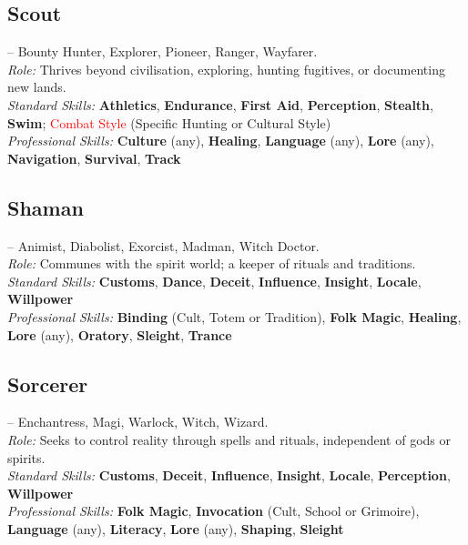 \documentclass[10pt]{article}
\newcommand{\skill}[1]{\textbf{#1}}
\begin{document}
\vspace{0.2cm}
\subsection*{Scout}
\label{career:scout}
 -- Bounty Hunter, Explorer, Pioneer, Ranger, Wayfarer.\\
\textit{Role:} Thrives beyond civilisation, exploring, hunting fugitives, or documenting new lands.\\
\textit{Standard Skills:} \skill{Athletics}, \skill{Endurance}, \skill{First Aid}, \skill{Perception}, \skill{Stealth}, \skill{Swim}; \textcolor{red}{Combat Style} (Specific Hunting or Cultural Style)\\
\textit{Professional Skills:} \skill{Culture} (any), \skill{Healing}, \skill{Language} (any), \skill{Lore} (any), \skill{Navigation}, \skill{Survival}, \skill{Track}

\vspace{0.2cm}
\subsection*{Shaman}
\label{career:shaman}
 -- Animist, Diabolist, Exorcist, Madman, Witch Doctor.\\
\textit{Role:} Communes with the spirit world; a keeper of rituals and traditions.\\
\textit{Standard Skills:} \skill{Customs}, \skill{Dance}, \skill{Deceit}, \skill{Influence}, \skill{Insight}, \skill{Locale}, \skill{Willpower}\\
\textit{Professional Skills:} \skill{Binding} (Cult, Totem or Tradition), \skill{Folk Magic}, \skill{Healing}, \skill{Lore} (any), \skill{Oratory}, \skill{Sleight}, \skill{Trance}

\vspace{0.2cm}
\subsection*{Sorcerer}
\label{career:sorcerer}
 -- Enchantress, Magi, Warlock, Witch, Wizard.\\
\textit{Role:} Seeks to control reality through spells and rituals, independent of gods or spirits.\\
\textit{Standard Skills:} \skill{Customs}, \skill{Deceit}, \skill{Influence}, \skill{Insight}, \skill{Locale}, \skill{Perception}, \skill{Willpower}\\
\textit{Professional Skills:} \skill{Folk Magic}, \skill{Invocation} (Cult, School or Grimoire), \skill{Language} (any), \skill{Literacy}, \skill{Lore} (any), \skill{Shaping}, \skill{Sleight}
\end{document}
